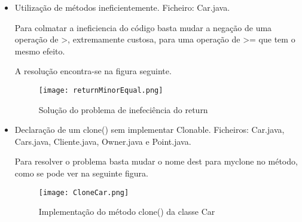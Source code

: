 \begin{itemize}
\item Utilização de métodos ineficientemente.\newline
 Ficheiro: Car.java.\newline


\par Para colmatar a ineficiencia do código basta mudar a negação de uma operação de >, extremamente custosa, para uma operação de >= que tem o mesmo efeito.\newline
\par A resolução encontra-se na figura seguinte. 
\begin{figure}[H]

  \centering

  \texttt{[image: returnMinorEqual.png]}

  \caption {Solução do problema de inefeciência do return}

  \label {fig20}

\end{figure}

\end{itemize}

\begin{itemize}
\item Declaração de um clone() sem implementar Clonable.\newline
 Ficheiros: Car.java, Cars.java, Cliente.java, Owner.java e Point.java.\newline


\par Para resolver o problema basta mudar o nome dest para myclone no método, como se pode ver na seguinte figura.\newline

\begin{figure}[H]

  \centering

  \texttt{[image: CloneCar.png]}


  \caption {Implementação do método clone() da classe Car}

  \label {fig21}

\end{figure}

\end{itemize}


